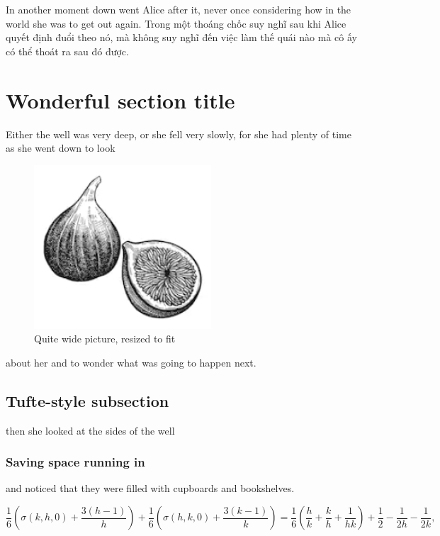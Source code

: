 \documentclass[10pt]{article}
\begin{document}
    In another moment down went Alice after it, never once considering how in the world she was to get out again.
    Trong một thoáng chốc suy nghĩ sau khi Alice quyết định đuổi theo nó, mà không suy nghĩ đến việc làm thế quái nào mà cô ấy có thể thoát ra sau đó được.

    \section{Wonderful section title}

    Either the well was very deep, or she fell very slowly, for she had plenty of time as she went down to look
    \begin{figure}[htb]
        \centering
        \includegraphics[width=0.5 \textwidth]{fig1}
        \caption{Quite wide picture, resized to fit}
    \end{figure}
    about her and to wonder what was going to happen next.

    \subsection{Tufte-style subsection}

    then she looked at the sides of the well

    \subsubsection{Saving space running in} and noticed that they were filled with cupboards and book\-shel\-ves.

    \begin{dmath}[label={sna74}]
        \frac{1}{6} \left(\sigma(k,h,0) +\frac{3(h-1)}{h}\right)
        +\frac{1}{6} \left(\sigma(h,k,0) +\frac{3(k-1)}{k}\right)
        =\frac{1}{6} \left(\frac{h}{k} +\frac{k}{h} +\frac{1}{hk}\right)
        +\frac{1}{2} -\frac{1}{2h} -\frac{1}{2k},
    \end{dmath}
\end{document}
